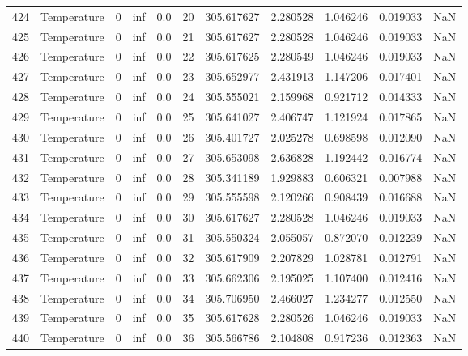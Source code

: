 \begin{tabular}{llrrrrrrrrr}
424 &  Temperature &       0 &  inf &  0.0 &   20 &  305.617627 &  2.280528 &  1.046246 &   0.019033 &      NaN \\
425 &  Temperature &       0 &  inf &  0.0 &   21 &  305.617627 &  2.280528 &  1.046246 &   0.019033 &      NaN \\
426 &  Temperature &       0 &  inf &  0.0 &   22 &  305.617625 &  2.280549 &  1.046246 &   0.019033 &      NaN \\
427 &  Temperature &       0 &  inf &  0.0 &   23 &  305.652977 &  2.431913 &  1.147206 &   0.017401 &      NaN \\
428 &  Temperature &       0 &  inf &  0.0 &   24 &  305.555021 &  2.159968 &  0.921712 &   0.014333 &      NaN \\
429 &  Temperature &       0 &  inf &  0.0 &   25 &  305.641027 &  2.406747 &  1.121924 &   0.017865 &      NaN \\
430 &  Temperature &       0 &  inf &  0.0 &   26 &  305.401727 &  2.025278 &  0.698598 &   0.012090 &      NaN \\
431 &  Temperature &       0 &  inf &  0.0 &   27 &  305.653098 &  2.636828 &  1.192442 &   0.016774 &      NaN \\
432 &  Temperature &       0 &  inf &  0.0 &   28 &  305.341189 &  1.929883 &  0.606321 &   0.007988 &      NaN \\
433 &  Temperature &       0 &  inf &  0.0 &   29 &  305.555598 &  2.120266 &  0.908439 &   0.016688 &      NaN \\
434 &  Temperature &       0 &  inf &  0.0 &   30 &  305.617627 &  2.280528 &  1.046246 &   0.019033 &      NaN \\
435 &  Temperature &       0 &  inf &  0.0 &   31 &  305.550324 &  2.055057 &  0.872070 &   0.012239 &      NaN \\
436 &  Temperature &       0 &  inf &  0.0 &   32 &  305.617909 &  2.207829 &  1.028781 &   0.012791 &      NaN \\
437 &  Temperature &       0 &  inf &  0.0 &   33 &  305.662306 &  2.195025 &  1.107400 &   0.012416 &      NaN \\
438 &  Temperature &       0 &  inf &  0.0 &   34 &  305.706950 &  2.466027 &  1.234277 &   0.012550 &      NaN \\
439 &  Temperature &       0 &  inf &  0.0 &   35 &  305.617628 &  2.280526 &  1.046246 &   0.019033 &      NaN \\
440 &  Temperature &       0 &  inf &  0.0 &   36 &  305.566786 &  2.104808 &  0.917236 &   0.012363 &      NaN \\

\end{tabular}
